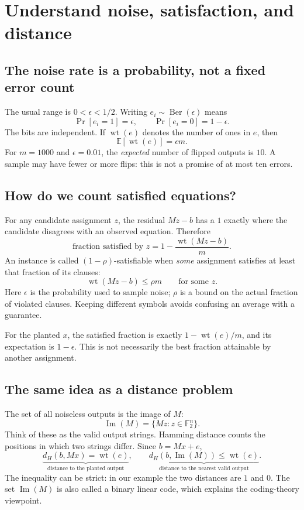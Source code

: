 \documentclass[11pt,a4paper]{article}
\newcommand{\F}{\mathbb{F}}
\newcommand{\E}{\mathbb{E}}
\newcommand{\wt}{\operatorname{wt}}
\newcommand{\Image}{\operatorname{Im}}
\newcommand{\Ber}{\operatorname{Ber}}
\begin{document}
\newpage
\section{Understand noise, satisfaction, and distance}
\subsection*{The noise rate is a probability, not a fixed error count}
The usual range is $0<\epsilon<1/2$. Writing $e_i\sim\Ber(\epsilon)$ means
\[
\Pr[e_i=1]=\epsilon,\qquad \Pr[e_i=0]=1-\epsilon.
\]
The bits are independent. If $\wt(e)$ denotes the number of ones in $e$, then
\[
\boxed{\E[\wt(e)]=\epsilon m.}
\]
For $m=1000$ and $\epsilon=0.01$, the \emph{expected} number of flipped outputs is $10$. A sample may have fewer or more flips: this is not a promise of at most ten errors.~\cite{draft1,draft2}

\subsection*{How do we count satisfied equations?}
For any candidate assignment $z$, the residual $Mz-b$ has a $1$ exactly where the candidate disagrees with an observed equation. Therefore
\[
\boxed{\text{fraction satisfied by }z
=1-\frac{\wt(Mz-b)}{m}.}
\]
An instance is called $(1-\rho)$-satisfiable when \emph{some} assignment satisfies at least that fraction of its clauses:
\[
\wt(Mz-b)\leq \rho m\qquad\text{for some }z.
\]
Here $\epsilon$ is the probability used to sample noise; $\rho$ is a bound on the actual fraction of violated clauses. Keeping different symbols avoids confusing an average with a guarantee.

For the planted $x$, the satisfied fraction is exactly $1-\wt(e)/m$, and its expectation is $1-\epsilon$. This is not necessarily the best fraction attainable by another assignment.~\cite{draft2}

\subsection*{The same idea as a distance problem}
The set of all noiseless outputs is the image of $M$:
\[
\Image(M)=\{Mz:z\in\F_2^n\}.
\]
Think of these as the valid output strings. Hamming distance counts the positions in which two strings differ. Since $b=Mx+e$,
\[
\underbrace{d_H(b,Mx)=\wt(e)}_{\text{distance to the planted output}},
\qquad
\underbrace{d_H(b,\Image(M))\leq\wt(e)}_{\text{distance to the nearest valid output}}.
\]
The inequality can be strict: in our example the two distances are $1$ and $0$. The set $\Image(M)$ is also called a binary linear code, which explains the coding-theory viewpoint.~\cite{draft2}
\end{document}
